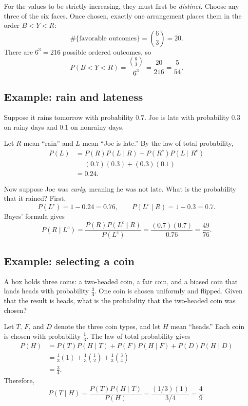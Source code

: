 \documentclass[11pt]{article}
\begin{document}
For the values to be strictly increasing, they must first be
\emph{distinct}. Choose any three of the six faces. Once chosen,
exactly one arrangement places them in the order $B<Y<R$:
\[
\#\{\text{favorable outcomes}\}=\binom63=20.
\]
There are $6^3=216$ possible ordered outcomes, so
\[
\boxed{
P(B<Y<R)=\frac{\binom63}{6^3}
=\frac{20}{216}
=\frac5{54}.
}
\]

\subsection{Example: rain and lateness}

Suppose it rains tomorrow with probability $0.7$. Joe is late with
probability $0.3$ on rainy days and $0.1$ on nonrainy days.

Let $R$ mean ``rain'' and $L$ mean ``Joe is late.'' By the law of
total probability,
\[
\begin{aligned}
P(L)
&=P(R)P(L\mid R)+P(R^c)P(L\mid R^c)\\
&=(0.7)(0.3)+(0.3)(0.1)\\
&=\boxed{0.24}.
\end{aligned}
\]

Now suppose Joe was \emph{early}, meaning he was not late. What is
the probability that it rained? First,
\[
P(L^c)=1-0.24=0.76,
\qquad
P(L^c\mid R)=1-0.3=0.7.
\]
Bayes' formula gives
\[
\boxed{
P(R\mid L^c)
=\frac{P(R)P(L^c\mid R)}{P(L^c)}
=\frac{(0.7)(0.7)}{0.76}
=\frac{49}{76}.
}
\]

\subsection{Example: selecting a coin}

A box holds three coins: a two-headed coin, a fair coin, and a
biased coin that lands heads with probability $\tfrac34$.
One coin is chosen uniformly and flipped. Given that the result
is heads, what is the probability that the two-headed coin
was chosen?

Let $T$, $F$, and $D$ denote the three coin types, and let $H$
mean ``heads.'' Each coin is chosen with probability $\tfrac13$.
The law of total probability gives
\[
\begin{aligned}
P(H)
&=P(T)P(H\mid T)
 +P(F)P(H\mid F)
 +P(D)P(H\mid D)\\
&=\frac13(1)+\frac13\left(\frac12\right)
  +\frac13\left(\frac34\right)\\
&=\frac34.
\end{aligned}
\]
Therefore,
\[
\boxed{
P(T\mid H)
=\frac{P(T)P(H\mid T)}{P(H)}
=\frac{(1/3)(1)}{3/4}
=\frac49.
}
\]
\end{document}
